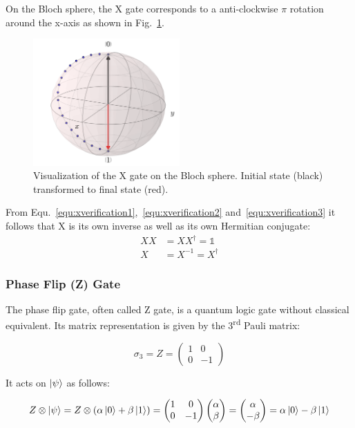 On the Bloch sphere, the X gate corresponds to a anti-clockwise $\pi$ rotation around the x-axis as shown in Fig.~\ref{img:blochxgate}.

\begin{figure}[ht]
   \centering
   \includegraphics[width=0.5\textwidth]{img/blochxgate.png}
   \caption{Visualization of the X gate on the Bloch sphere. Initial state (black) transformed to final state (red).}
   \label{img:blochxgate}
\end{figure}

From Equ.~\ref{equ:xverification1},~\ref{equ:xverification2} and~\ref{equ:xverification3} it follows that X is its own inverse as well as its own Hermitian conjugate:
\begin{align}
XX &= XX^\dagger = \mathbb{1} \\
X &= X^{-1} = X^\dagger
\end{align}

\subsubsection{Phase Flip (Z) Gate}
\label{subsubsubsec:zgate}

The phase flip gate, often called Z gate, is a quantum logic gate without classical equivalent. Its matrix representation is given by the 3\textsuperscript{rd} Pauli matrix:

\begin{equation}
\sigma_{3} = Z = \begin{pmatrix}
 1 & 0 \\ 
 0 & -1
 \end{pmatrix}
\end{equation}

It acts on $\ket{\psi}$ as follows:

\begin{equation}
\label{equ:zverification1}
Z \otimes \ket{\psi} = Z \otimes (\alpha \ket{0} + \beta \ket{1}) = \begin{pmatrix}
 1 & 0 \\ 
 0 & -1
 \end{pmatrix} \begin{pmatrix}
 \alpha  \\ 
 \beta
 \end{pmatrix} = \begin{pmatrix}
 \alpha  \\ 
 -\beta
 \end{pmatrix} = \alpha \ket{0} - \beta \ket{1}
\end{equation}

